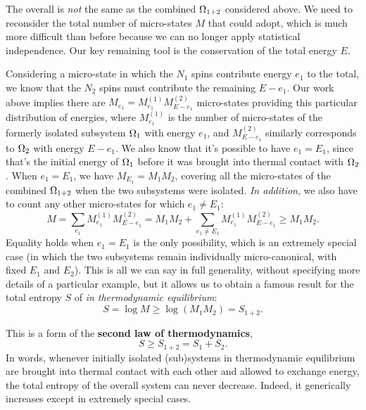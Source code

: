 The overall \Om is \textit{not} the same as the combined $\Omega_{1+2}$ considered above.
We need to reconsider the total number of micro-states $M$ that \Om could adopt, which is much more difficult than before because we can no longer apply statistical independence.
Our key remaining tool is the conservation of the total energy $E$.

Considering a micro-state in which the $N_1$ spins contribute energy $e_1$ to the total, we know that the $N_2$ spins must contribute the remaining $E - e_1$.
Our work above implies there are $M_{e_1} = M_{e_1}^{(1)} M_{E - e_1}^{(2)}$ micro-states providing this particular distribution of energies, where $M_{e_1}^{(1)}$ is the number of micro-states of the formerly isolated subsystem $\Omega_1$ with energy $e_1$, and $M_{E - e_1}^{(2)}$ similarly corresponds to $\Omega_2$ with energy $E - e_1$.
We also know that it's possible to have $e_1 = E_1$, since that's the initial energy of $\Omega_1$ before it was brought into thermal contact with $\Omega_2$.
When $e_1 = E_1$, we have $M_{E_1} = M_1 M_2$, covering all the micro-states of the combined $\Omega_{1+2}$ when the two subsystems were isolated.
\textit{In addition}, we also have to count any other micro-states for which $e_1 \ne E_1$:
\begin{equation}
  \label{eq:micro_sum}
  M = \sum_{e_1} M_{e_1}^{(1)} M_{E - e_1}^{(2)} = M_1 M_2 + \sum_{e_1 \ne E_1} M_{e_1}^{(1)} M_{E - e_1}^{(2)} \geq M_1 M_2.
\end{equation}
Equality holds when $e_1 = E_1$ is the only possibility, which is an extremely special case (in which the two subsystems remain individually micro-canonical, with fixed $E_1$ and $E_2$).
This is all we can say in full generality, without specifying more details of a particular example, but it allows us to obtain a famous result for the total entropy $S$ of \Om \textit{in thermodynamic equilibrium}:
\begin{equation*}
  S = \log M \geq \log\left(M_1 M_2\right) = S_{1+2}.
\end{equation*}

\begin{shaded}
  This is a form of the \textbf{second law of thermodynamics},
  \begin{equation*}
    S \geq S_{1 + 2} = S_1 + S_2.
  \end{equation*}
  In words, whenever initially isolated (sub)systems in thermodynamic equilibrium are brought into thermal contact with each other and allowed to exchange energy, the total entropy of the overall system can never decrease.
  Indeed, it generically increases except in extremely special cases.
\end{shaded}

